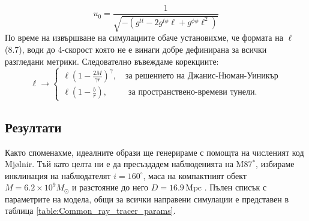 \documentclass[12pt]{article}
\numberwithin{equation}{section}
\numberwithin{figure}{section}
\begin{document}
	\begin{equation}
		u_0 = \frac{1}{\sqrt{-(g^{tt} - 2g^{t\phi}\ell + g^{\phi\phi}\ell^2)}}
	\end{equation}
	По време на извършване на симулациите обаче установихме, че формата на $\ell$ (8.7), води до 4-скорост която не е винаги добре дефинирана за всички разгледани метрики. Следователно въвеждаме корекциите:
	\begin{equation}
		\ell\rightarrow\begin{cases}
			\ell \left(1 - \frac{2M}{\gamma r}\right)^{\gamma}, \quad\text{за решението на Джанис-Нюман-Уиникър}\\
			\ell \left(1 - \frac{b}{r}\right), \,\,\,\qquad\text{за пространствено-времеви тунели}.
		\end{cases}
	\end{equation}
	
	\subsection{Резултати}
	
	Както споменахме, идеалните образи ще генерираме с помощта на численият код Mjølnir. Тъй като целта ни е да пресъздадем наблюденията на M87$^*$, избираме инклинация на наблюдателят $i = 160^\circ$, маса на компактният обект $M = 6.2\times 10^9M_\odot$ и разстояние до него $D = 16.9\, \text{Mpc}$ \cite{EHT_M87_I}. Пълен списък с параметрите на модела, общи за всички направени симулации е представен в таблица \ref{table:Common_ray_tracer_params}.\\
	
\end{document}
